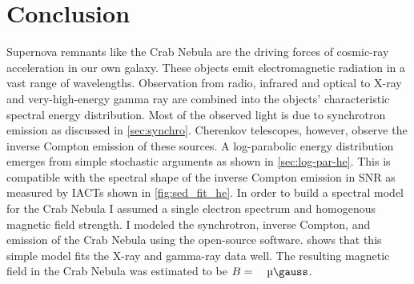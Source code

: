 \chapter{Conclusion}

Supernova remnants like the Crab Nebula are the driving forces of cosmic-ray acceleration in our own galaxy.
These objects emit electromagnetic radiation in a vast range of wavelengths. Observation from radio, infrared and optical 
to X-ray and very-high-energy gamma ray are combined into the objects' characteristic spectral energy distribution. 
Most of the observed light is due to synchrotron emission as discussed in \cref{sec:synchro}.
Cherenkov telescopes, however, observe the inverse Compton emission of these sources. 
A log-parabolic energy distribution emerges from simple stochastic arguments as shown in \cref{sec:log-par-he}. 
This is compatible with the spectral shape of the inverse Compton emission in SNR
as measured by IACTs shown in \cref{fig:sed_fit_he}.
In order to build a spectral model for the Crab Nebula I assumed a single electron spectrum and homogenous magnetic field strength.
I modeled the synchrotron, inverse Compton, and \ssclong emission of the Crab Nebula 
using the open-source \naima software.
 shows that this simple model fits the X-ray and gamma-ray data well. The resulting magnetic field in 
the Crab Nebula was estimated to be $B =  \quad \si{\micro\gauss}$. 

